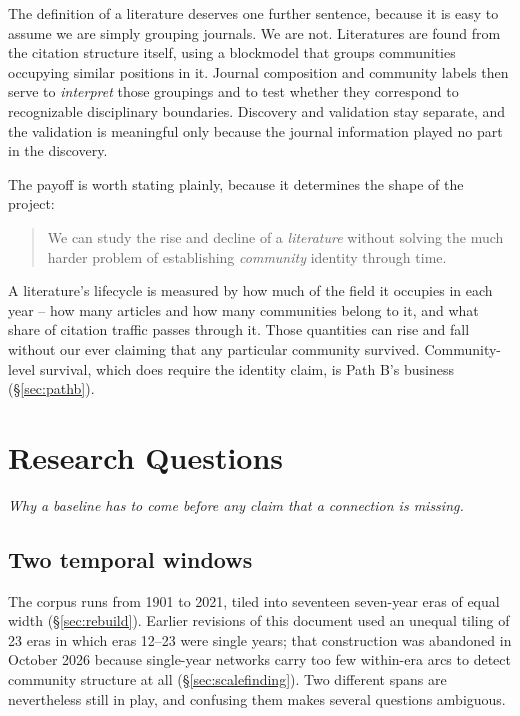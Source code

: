 \documentclass[11pt]{article}
\newcommand{\seccap}[1]{{\slshape\small #1\par}\vspace{0.8em}}
\begin{document}
The definition of a literature deserves one further sentence, because it is easy to
assume we are simply grouping journals. We are not. Literatures are found from the
citation structure itself, using a blockmodel that groups communities occupying similar
positions in it. Journal composition and community labels then serve to \emph{interpret}
those groupings and to test whether they correspond to recognizable disciplinary
boundaries. Discovery and validation stay separate, and the validation is meaningful only
because the journal information played no part in the discovery.

The payoff is worth stating plainly, because it determines the shape of the project:

\begin{quote}
We can study the rise and decline of a \emph{literature} without solving the much harder
problem of establishing \emph{community} identity through time.
\end{quote}

A literature's lifecycle is measured by how much of the field it occupies in each year --
how many articles and how many communities belong to it, and what share of citation
traffic passes through it. Those quantities can rise and fall without our ever claiming
that any particular community survived. Community-level survival, which does require the
identity claim, is Path B's business (\S\ref{sec:pathb}).

\section{Research Questions}
\label{sec:questions}
\seccap{Why a baseline has to come before any claim that a connection is missing.}

\subsection{Two temporal windows}

The corpus runs from 1901 to 2021, tiled into seventeen seven-year eras of equal width
(\S\ref{sec:rebuild}). Earlier revisions of this document used an unequal tiling of 23
eras in which eras 12--23 were single years; that construction was abandoned in October
2026 because single-year networks carry too few within-era arcs to detect community
structure at all (\S\ref{sec:scalefinding}). Two different spans are nevertheless still in play,
and confusing them makes several questions ambiguous.
\end{document}
